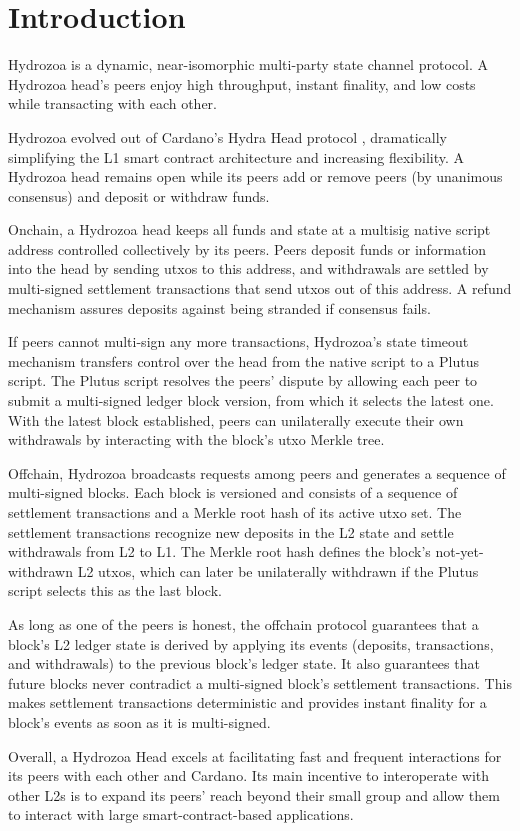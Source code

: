 \documentclass[../hydrozoa.tex]{subfiles}
\begin{document}
\section*{Introduction}%
\label{h:introduction}


Hydrozoa is a dynamic, near-isomorphic multi-party state channel protocol.
A Hydrozoa head's peers enjoy high throughput, instant finality, and low costs while transacting with each other.

Hydrozoa evolved out of Cardano's Hydra Head protocol \citep{NagelEtAlHydraHeadV1Specification2024}, dramatically simplifying the L1 smart contract architecture and increasing flexibility.
A Hydrozoa head remains open while its peers add or remove peers (by unanimous consensus) and deposit or withdraw funds.

Onchain, a Hydrozoa head keeps all funds and state at a multisig native script address controlled collectively by its peers.
Peers deposit funds or information into the head by sending utxos to this address,
and withdrawals are settled by multi-signed settlement transactions that send utxos out of this address.
A refund mechanism assures deposits against being stranded if consensus fails.

If peers cannot multi-sign any more transactions, Hydrozoa's state timeout mechanism transfers control over the head from the native script to a Plutus script.
The Plutus script resolves the peers' dispute by allowing each peer to submit a multi-signed ledger block version, from which it selects the latest one.
With the latest block established, peers can unilaterally execute their own withdrawals by interacting with the block's utxo Merkle tree.

Offchain, Hydrozoa broadcasts requests among peers and generates a sequence of multi-signed blocks.
Each block is versioned and consists of a sequence of settlement transactions and a Merkle root hash of its active utxo set.
The settlement transactions recognize new deposits in the L2 state and settle withdrawals from L2 to L1.
The Merkle root hash defines the block's not-yet-withdrawn L2 utxos, which can later be unilaterally withdrawn if the Plutus script selects this as the last block.

As long as one of the peers is honest, the offchain protocol guarantees that a block's L2 ledger state is derived by applying its events (deposits, transactions, and withdrawals) to the previous block's ledger state.
It also guarantees that future blocks never contradict a multi-signed block's settlement transactions.
This makes settlement transactions deterministic and provides instant finality for a block's events as soon as it is multi-signed.

Overall, a Hydrozoa Head excels at facilitating fast and frequent interactions for its peers with each other and Cardano.
Its main incentive to interoperate with other L2s is to expand its peers' reach beyond their small group and allow them to interact with large smart-contract-based applications.

\end{document}
